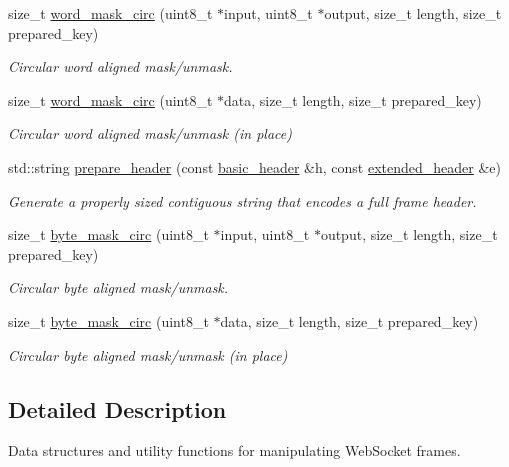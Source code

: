 \begin{DoxyCompactItemize}
size\+\_\+t \hyperlink{namespacewebsocketpp_1_1frame_aa3458068f08acb26e350e39375265085}{word\+\_\+mask\+\_\+circ} (uint8\+\_\+t $\ast$input, uint8\+\_\+t $\ast$output, size\+\_\+t length, size\+\_\+t prepared\+\_\+key)
\begin{DoxyCompactList}\small\item\em Circular word aligned mask/unmask. \end{DoxyCompactList}\item 
size\+\_\+t \hyperlink{namespacewebsocketpp_1_1frame_af1365b296d14ee7dea6e17d0af368821}{word\+\_\+mask\+\_\+circ} (uint8\+\_\+t $\ast$data, size\+\_\+t length, size\+\_\+t prepared\+\_\+key)
\begin{DoxyCompactList}\small\item\em Circular word aligned mask/unmask (in place) \end{DoxyCompactList}\item 
std\+::string \hyperlink{namespacewebsocketpp_1_1frame_ae63c3e01399a6787ed09b710853344a4}{prepare\+\_\+header} (const \hyperlink{structwebsocketpp_1_1frame_1_1basic__header}{basic\+\_\+header} \&h, const \hyperlink{structwebsocketpp_1_1frame_1_1extended__header}{extended\+\_\+header} \&e)
\begin{DoxyCompactList}\small\item\em Generate a properly sized contiguous string that encodes a full frame header. \end{DoxyCompactList}\item 
size\+\_\+t \hyperlink{namespacewebsocketpp_1_1frame_a3e0ba89b475df758d84dab352a76c3b3}{byte\+\_\+mask\+\_\+circ} (uint8\+\_\+t $\ast$input, uint8\+\_\+t $\ast$output, size\+\_\+t length, size\+\_\+t prepared\+\_\+key)
\begin{DoxyCompactList}\small\item\em Circular byte aligned mask/unmask. \end{DoxyCompactList}\item 
size\+\_\+t \hyperlink{namespacewebsocketpp_1_1frame_a5e0b4f532f0d309a605e232cfdb03960}{byte\+\_\+mask\+\_\+circ} (uint8\+\_\+t $\ast$data, size\+\_\+t length, size\+\_\+t prepared\+\_\+key)
\begin{DoxyCompactList}\small\item\em Circular byte aligned mask/unmask (in place) \end{DoxyCompactList}\end{DoxyCompactItemize}


\subsection{Detailed Description}
Data structures and utility functions for manipulating Web\+Socket frames. 

